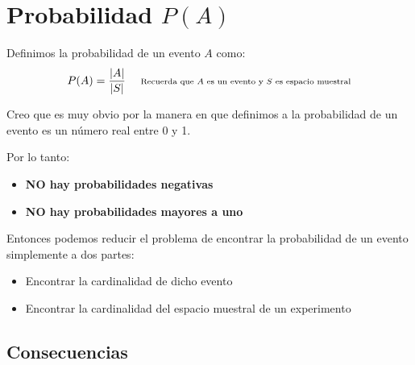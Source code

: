\documentclass[12pt, fleqn]{report}                             %
\DeclareMathOperator \Space {\quad}                             %
\newcommand \Remember[1]{\Space\text{\scriptsize{#1}}}          %
\theoremstyle{break}                                            %
\begin{document}
        \clearpage
        \section{Probabilidad $P(A)$}

            Definimos la probabilidad de un evento $A$ como:
            \begin{equation*}
                P(A) = \frac{|A|}{|S|} \Remember{Recuerda que $A$ es un evento y $S$ es espacio muestral}
            \end{equation*}

            Creo que es muy obvio por la manera en que definimos a la probabilidad de un evento
            es un número real entre 0 y 1.

            Por lo tanto:
            \begin{itemize}
                \item \textbf{NO hay probabilidades negativas}
                \item \textbf{NO hay probabilidades mayores a uno}
            \end{itemize}

            Entonces podemos reducir el problema de encontrar la probabilidad de un evento
            simplemente a dos partes:
            \begin{itemize}
                \item Encontrar la cardinalidad de dicho evento
                \item Encontrar la cardinalidad del espacio muestral de un experimento 
            \end{itemize}


            \clearpage
            \subsection{Consecuencias}
\end{document}
